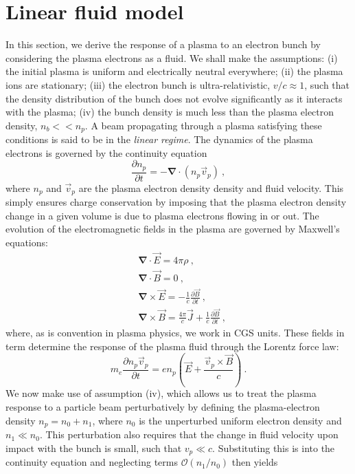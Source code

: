 \section{Linear fluid model }
In this section, we derive the response of a plasma to an electron bunch by considering the plasma electrons as a fluid. We shall make the assumptions:  (i) the initial plasma is uniform and electrically neutral everywhere; (ii) the plasma ions are stationary; (iii) the electron bunch is ultra-relativistic, $v/c\approx 1$, such that the density distribution of the bunch does not evolve significantly as it interacts with the plasma; (iv) the bunch density is much less than the plasma electron density, $n_b<<n_p$.  A beam propagating through a plasma satisfying these conditions is said to be in the \textit{linear regime}. The dynamics of the plasma electrons is governed by the continuity equation
\begin{equation}
\frac{\partial n_p}{\partial t}=-\mathbf{\nabla}\cdot (n_p\vec{v}_p)~,
\end{equation}
where $n_p$ and $\vec{v}_p$ are the plasma electron density density and fluid velocity. This simply ensures charge conservation by imposing that the plasma electron density change in a given volume is due to plasma electrons flowing in or out. The evolution of the electromagnetic fields in the plasma are governed by Maxwell's equations:
\begin{align}
\label{Maxwell1}
&\boldsymbol{\nabla}\cdot \vec{E}=4\pi \rho~,\\
&\boldsymbol{\nabla}\cdot \vec{B}=0~,\\
&\boldsymbol{\nabla}\times \vec{E}=-\frac{1}{c}\frac{\partial \vec{B}}{\partial t} ~,\\
&\boldsymbol{\nabla}\times \vec{B}=\frac{4\pi}{c}\vec{J}+\frac{1}{c}\frac{\partial \vec{B}}{\partial t}~,
\label{Maxwell4}
\end{align}
where, as is convention in plasma physics, we work in CGS units. 
These fields in term determine the response of the plasma fluid through the Lorentz force law:
\begin{equation}
m_e\frac{\partial n_p\vec{v}_p}{\partial t}=en_p\left(\vec{E}+\frac{\vec{v}_p\times \vec{B}}{c}\right)~.
\end{equation}
We now make use of assumption (iv), which allows us to treat the plasma response to a particle beam perturbatively by defining the plasma-electron density $n_p=n_0+n_1$, where $n_0$ is the unperturbed uniform electron density and $n_1\ll n_0$. This perturbation also requires that the change in fluid velocity upon impact with the bunch is small, such that $v_p\ll c$. Substituting this is into the continuity equation  and neglecting terms $\mathcal{O}(n_1/n_0)$ then yields 
